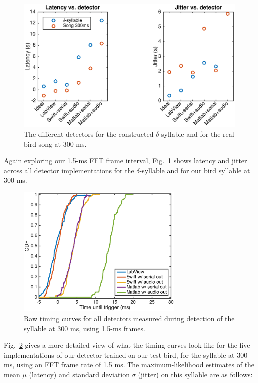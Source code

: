 \documentclass[10pt,letterpaper]{article}
\newcommand\fig[1]{Fig.~\ref{#1}}
\begin{document}
\begin{figure}
  \includegraphics[width=\textwidth]{TimingVsDetector}
  \caption{The different detectors for the constructed $\delta$-syllable and for the real bird song at 300 ms.}
  \label{fig:TimingVsDetector}
\end{figure}

Again exploring our 1.5-ms FFT frame interval, \fig{fig:TimingVsDetector} shows latency and jitter across all detector implementations for the $\delta$-syllable and for our bird syllable at 300 ms.

\begin{figure}
  \begin{center}
    \includegraphics[width=8cm]{timing}
  \end{center}
  \caption{Raw timing curves for all detectors measured during detection of the syllable at 300 ms, using 1.5-ms frames.}
  \label{fig:timing}
\end{figure}


\fig{fig:timing} gives a more detailed view of what the timing curves look like for the five implementations of our detector trained on our test bird, for the syllable at 300 ms, using an FFT frame rate of 1.5 ms.  The maximum-likelihood estimates of the mean $\mu$ (latency) and standard deviation $\sigma$ (jitter) on this syllable are as follows:
\end{document}
